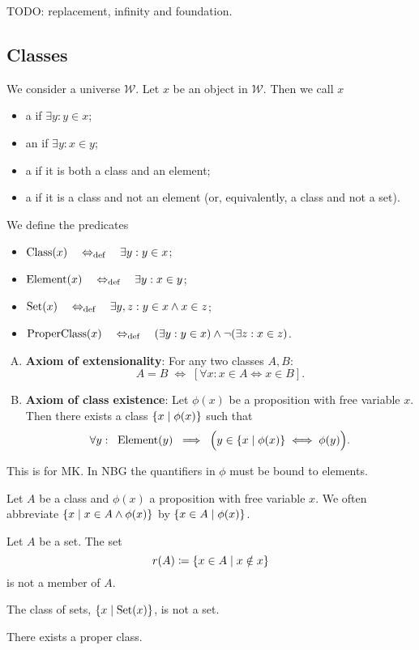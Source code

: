 TODO: replacement, infinity and foundation.

\subsection{Classes}
\begin{definition}
We consider a universe $\mathcal{W}$. Let $x$ be an object in $\mathcal{W}$. Then we call $x$
\begin{itemize}
\item a  if $\exists y: y\in x$;
\item an  if $\exists y: x\in y$;
\item a  if it is both a class and an element;
\item a  if it is a class and not an element (or, equivalently, a class and not a set).
\end{itemize}
We define the predicates
\begin{itemize}
\item $\operatorname{Class}(x) \quad\Leftrightarrow_{\text{def}}\quad \exists y: y\in x$;
\item $\operatorname{Element}(x) \quad\Leftrightarrow_{\text{def}}\quad \exists y: x\in y$;
\item $\operatorname{Set}(x) \quad\Leftrightarrow_{\text{def}}\quad \exists y,z: y\in x \land x\in z$;
\item $\operatorname{ProperClass}(x) \quad\Leftrightarrow_{\text{def}}\quad (\exists y: y \in x)\land \neg (\exists z: x\in z)$.
\end{itemize}
\end{definition}

\begin{enumerate}[(A)]
\item \textbf{Axiom of extensionality}: For any two classes $A,B$:
\[ A=B \;\iff\; \left[\forall x:x\in A\iff x\in B\right]. \]
\item \textbf{Axiom of class existence}: Let $\phi(x)$ be a proposition with free variable $x$. Then there exists a class $\left\{ x \;\middle|\; \phi(x) \right\}$ such that
\[ \forall y: \;\; \operatorname{Element}(y) \;\implies\; \Big( y\in \left\{ x \;\middle|\; \phi(x) \right\} \iff \phi(y) \Big). \]
\end{enumerate}
This is for MK. In NBG the quantifiers in $\phi$ must be bound to elements.

Let $A$ be a class and $\phi(x)$ a proposition with free variable $x$. We often abbreviate $\left\{ x \;\middle|\; x\in A \land \phi(x) \right\}$ by $\left\{ x\in A \;\middle|\; \phi(x) \right\}$.


\begin{proposition} \label{russelParadox}
Let $A$ be a set. The set
\[ r(A) \coloneqq \left\{ x\in A \;\middle|\;  x\notin x  \right\} \]
is not a member of $A$.
\end{proposition}
\begin{corollary} \label{setOfSets}
The class of sets, $\left\{ x \;\middle|\; \operatorname{Set}(x) \right\}$, is not a set.
\end{corollary}
\begin{corollary} \label{properClassExistence}
There exists a proper class.
\end{corollary}



